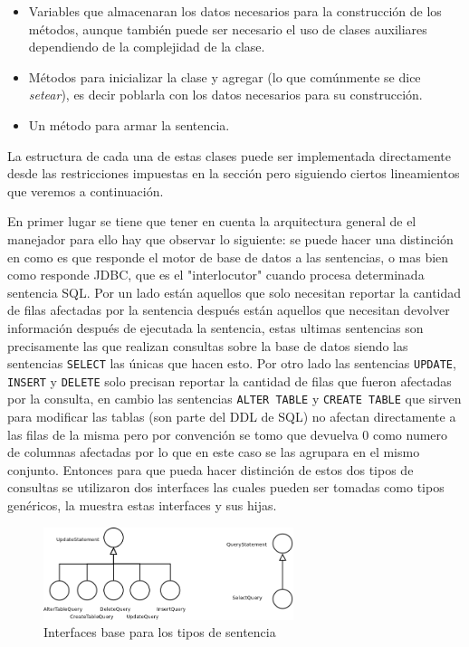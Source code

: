\begin{itemize}
\item Variables que almacenaran los datos necesarios para la construcción de los métodos, aunque también puede ser necesario el uso de clases auxiliares dependiendo de la complejidad de la clase.

\item Métodos para inicializar la clase y agregar (lo que comúnmente se dice \textit{setear}), es decir poblarla con los datos necesarios para su construcción.

\item Un método para armar la sentencia.

\end{itemize}

La estructura de cada una de estas clases puede ser implementada directamente desde las restricciones impuestas en la sección  pero siguiendo ciertos lineamientos que veremos a continuación.

En primer lugar se tiene que tener en cuenta la arquitectura general de el manejador para ello hay que observar lo siguiente: se puede hacer una distinción en como es que responde el motor de base de datos a las sentencias, o mas bien como responde JDBC, que es el "interlocutor" cuando procesa determinada sentencia SQL. Por un lado están aquellos que solo necesitan reportar la cantidad de filas afectadas por la sentencia después están aquellos que necesitan devolver información después de ejecutada la sentencia, estas ultimas sentencias son precisamente las que realizan consultas sobre la base de datos siendo las sentencias \verb=SELECT= las únicas que hacen esto. Por otro lado las sentencias \verb=UPDATE=, \verb=INSERT= y \verb=DELETE= solo precisan reportar la cantidad de filas que fueron afectadas por la consulta, en cambio las sentencias \verb=ALTER TABLE= y \verb=CREATE TABLE= que sirven para modificar las tablas (son parte del DDL de SQL) no afectan directamente a las filas de la misma pero por convención se tomo que \jd devuelva 0 como numero de columnas afectadas por lo que en este caso se las agrupara en el mismo conjunto. Entonces para que \jj pueda hacer distinción de estos dos tipos de consultas se utilizaron dos interfaces las cuales pueden ser tomadas como tipos genéricos, la  muestra estas interfaces y sus hijas.

\begin{figure}
  \centering
    \includegraphics[width=0.65\textwidth]{figuras/crossdb-base.png}
  \caption{Interfaces base para los tipos de sentencia}
  \label{fig:crossdb-base}
\end{figure}

